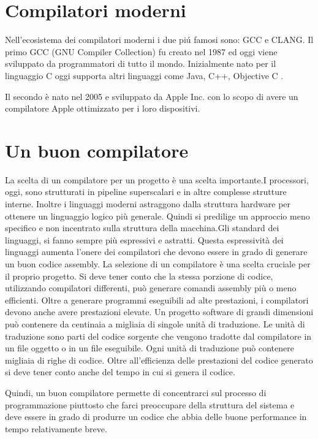 \documentclass[12pt, a4paper]{report}
\begin{document}
\section{Compilatori moderni}
Nell'ecosistema dei compilatori moderni i due pi\'u famosi sono: GCC e CLANG.
Il primo GCC (GNU Compiler Collection) fu creato nel 1987 ed oggi viene sviluppato da programmatori di tutto il mondo. Inizialmente nato per il linguaggio C oggi supporta altri linguaggi come Java, C++, Objective C \cite{GCCstory}.

Il secondo è nato nel 2005 e sviluppato da Apple Inc.  con lo scopo di avere un compilatore Apple ottimizzato per i loro dispositivi\cite{ClangStory}.

\section{Un buon compilatore} %
La scelta di un compilatore per un progetto è una scelta importante.I processori, oggi, sono strutturati in pipeline superscalari e in altre complesse strutture interne. Inoltre i linguaggi moderni astraggono dalla struttura hardware per ottenere un linguaggio logico più generale. Quindi si predilige un approccio meno specifico e non incentrato sulla struttura della macchina.Gli standard dei linguaggi, si fanno sempre più espressivi e astratti. Questa espressività dei linguaggi aumenta l'onere dei compilatori che devono essere in grado di generare un buon codice assembly. La selezione di un compilatore è una scelta cruciale per il proprio progetto. Si deve tener conto che la stessa porzione di codice, utilizzando compilatori differenti, può generare comandi assembly più o meno efficienti.
Oltre a generare programmi eseguibili ad alte prestazioni, i compilatori devono anche avere prestazioni elevate. Un progetto software di grandi dimensioni può contenere da centinaia a migliaia di singole unità di traduzione. Le unità di traduzione sono parti del codice sorgente che vengono tradotte dal compilatore in un file oggetto o in un file eseguibile. Ogni unità di traduzione può contenere migliaia di righe di codice. Oltre all'efficienza delle prestazioni del codice generato si deve tener conto anche del tempo in cui si genera il codice.

Quindi, un buon compilatore permette di concentrarci sul processo di programmazione piuttosto che farci preoccupare della struttura del sistema e deve essere in grado di produrre un codice che abbia delle buone performance in tempo relativamente breve.
\end{document}
